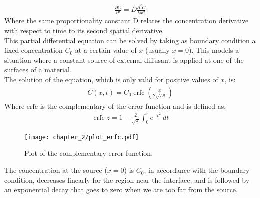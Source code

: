 \begin{align}
   \frac{\partial C}{\partial t}=D\frac{\partial^2C}{\partial x^2} \label{eq:second_law_1d}
\end{align}
Where the same proportionality constant D relates the concentration derivative with respect to time to its second spatial derivative.
\\
This partial differential equation can be solved by taking as boundary condition a fixed concentration $C_0$ at a certain value of $x$ (usually $x = 0$). This models a situation where a constant source of external diffusant is applied at one of the surfaces of a material.
\\
The solution of the equation, which is only valid for positive values of $x$, is:
\begin{align}
    C\left(x,t\right)=C_0\operatorname{erfc}\left(\frac{x}{2\sqrt{Dt}}\right) \label{eq:fick_solution}
\end{align}
Where $\mathrm{erfc}$ is the complementary of the error function and is defined as:
\begin{align}
   \operatorname{erfc}z=1-\frac{2}{\sqrt\pi}\int_{0}^{z}e^{-t^2}\ dt 
\end{align}

\begin{figure}[H]
    \centering
    \texttt{[image: chapter\_2/plot\_erfc.pdf]}
    \vspace*{-40pt}
    \caption[]{Plot of the complementary error function.}
    \label{fig:plot_erfc}
\end{figure}

The concentration at the source ($x = 0$) is $C_0$, in accordance with the boundary condition, decreases linearly for the region near the interface, and is followed by an exponential decay that goes to zero when we are too far from the source.
